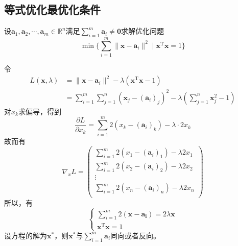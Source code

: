 \subsection{等式优化最优化条件}
\begin{example}
    设$\boldsymbol{a}_1,\boldsymbol{a}_2,\cdots,\boldsymbol{a}_m\in\mathbb{R}^n$满足$\sum\limits_{i = 1}^{m}\boldsymbol{a}_{i}\neq \boldsymbol{0}$求解优化问题
    \[
        \min\{\sum_{i=1}^{m}\|\boldsymbol{x}-\boldsymbol{a}_{i}\|^{2}\mid\boldsymbol{x}^{\mathrm{T}}\boldsymbol{x}=1\}
    \]
    \begin{solution}
        令
        \[
            \begin{aligned}
                L(\boldsymbol{x},\lambda)&=\|\boldsymbol{x}-\boldsymbol{a}_{i}\|^{2}-\lambda(\boldsymbol{x}^{\mathrm{T}}\boldsymbol{x}-1)\\
                &=\sum_{i=1}^{m}\sum_{j=1}^{n}\left( \boldsymbol{x}_j-(\boldsymbol{a}_{i})_{j} \right)^2-\lambda\left( \sum_{j = 1}^{n}\boldsymbol{x}_j^2-1\right)
            \end{aligned}
        \]
        对$x_k$求偏导，得到
        \[
            \dfrac{\partial L}{\partial x_{k}} = \sum_{i = 1}^{m}2(x_{k}-(\boldsymbol{a}_{i})_{k})-\lambda\cdot 2 x_{k}
        \]
        故而有
        \[
            \nabla_{x}L = \begin{pmatrix}
                \sum_{i = 1}^{m}2(x_{1}-(\boldsymbol{a}_{i})_{1})-\lambda 2x_{1}\\
                \sum_{i = 1}^{m}2(x_{2}-(\boldsymbol{a}_{i})_{2})-\lambda 2x_{2}\\
                \vdots\\
                \sum_{i = 1}^{m}2(x_{n}-(\boldsymbol{a}_{i})_{n})-\lambda 2x_{n}\\
            \end{pmatrix} 
        \]
        所以，有
        \[
            \begin{cases}
                \sum\limits_{i = 1}^{m}2(\boldsymbol{x-\boldsymbol{a}_{i}}) = 2\lambda\boldsymbol{x}\\
                \boldsymbol{x}^{\mathrm{T}}\boldsymbol{x}=1
            \end{cases}
        \]
        设方程的解为$\boldsymbol{x}^*$，则$\boldsymbol{x}^*$与$\sum\limits_{i = 1}^{m}\boldsymbol{a}_i$同向或者反向。


\end{solution}
\end{example}

